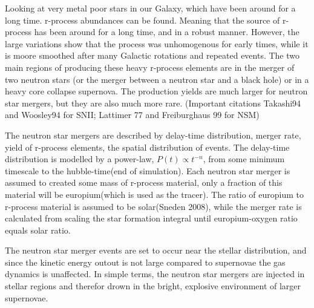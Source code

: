 Looking at very metal poor stars in our Galaxy, which have been around for a long time. r-process abundances can be found. Meaning that the source of r-process has been around for a long time, and in a robust manner. However, the large variations show that the process was unhomogenous for early times, while it is moore smoothed after many Galactic rotations and repeated events.
The two main regions of producing these heavy r-process elements are in the merger of two neutron stars (or the merger between a neutron star and a black hole) or in a heavy core collapse supernova. The production yields are much larger for neutron star mergers, but they are also much more rare.
(Important citations Takashi94 and Woosley94 for SNII; Lattimer 77 and Freiburghaus 99 for NSM)

The neutron star mergers are described by delay-time distribution, merger rate, yield of r-process elements, the spatial distribution of events.
The delay-time distribution is modelled by a power-law, $P(t) \propto t^{-n}$, from some minimum timescale to the hubble-time(end of simulation).
Each neutron star merger is assumed to created some mass of r-process material, only a fraction of this material will be europium(which is used as the tracer).
The ratio of europium to r-process material is assumed to be solar(Sneden 2008), while the merger rate is calculated from scaling the star formation integral until europium-oxygen ratio equals solar ratio.

The neutron star merger events are set to occur near the stellar distribution, and since the kinetic energy outout is not large compared to supernovae the gas dynamics is unaffected.
In simple terms, the neutron star mergers are injected in stellar regions and therefor drown in the bright, explosive environment of larger supernovae.

